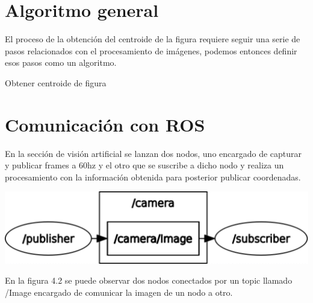 
\section{Algoritmo general}
El proceso de la obtención del centroide de la figura requiere seguir una serie de pasos relacionados con el
procesamiento de imágenes, podemos entonces definir esos pasos como un algoritmo.

\begin{algorithm}
	\caption{Obtener centroide de figura}
	\begin{algorithmic}[1]
	\end{algorithmic}
\end{algorithm}




\section{Comunicación con ROS}
En la sección de visión artificial se lanzan dos nodos, uno encargado de capturar y
publicar frames a 60hz y el otro que se suscribe a dicho nodo y realiza un procesamiento
con la información obtenida para posterior publicar coordenadas.
\begin{center}
	\includegraphics[width=0.56 \textwidth]{Contenido/Cuerpo/Capitulo4/Fig0.eps}
	\label{Fig1}
\end{center}
En la figura 4.2 se puede observar dos nodos conectados por un topic llamado /Image
encargado de comunicar la imagen de un nodo a otro.
